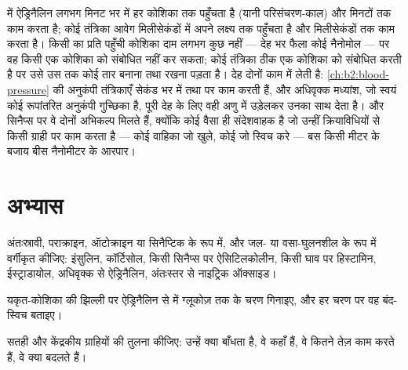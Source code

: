 \begin{example}[दोनों तंत्रों की गति, पहुँच और लागत]\label{ex:b2:cell-signalling:compare}
 में ऐड्रिनैलिन लगभग मिनट भर में हर कोशिका तक पहुँचता है
(यानी परिसंचरण-काल) और मिनटों तक काम करता है; कोई तंत्रिका आवेग
मिलीसेकंडों में अपने लक्ष्य तक पहुँचता है और मिलीसेकंडों तक काम करता है। किसी
 का प्रति पहुँची कोशिका दाम लगभग कुछ नहीं --- देह भर फैला कोई नैनोमोल ---
पर वह किसी एक कोशिका को संबोधित नहीं कर सकता; कोई तंत्रिका ठीक एक
कोशिका को संबोधित करती है पर उसे उस तक कोई तार बनाना तथा रखना पड़ता है। देह
दोनों काम में लेती है: \cref{ch:b2:blood-pressure} की अनुकंपी तंत्रिकाएँ सेकंड भर में
 तथा  पर काम करती हैं, और अधिवृक्क मध्यांश,
जो स्वयं कोई रूपांतरित अनुकंपी गुच्छिका है, पूरी देह के लिए वही अणु
 में उड़ेलकर उनका साथ देता है। और सिनैप्स पर
वे दोनों अभिकल्प मिलते हैं, क्योंकि कोई  वैसा ही संदेशवाहक है जो
उन्हीं क्रियाविधियों से किसी ग्राही पर काम करता है --- कोई वाहिका जो खुले, कोई  जो स्विच करे --- बस किसी मीटर के बजाय बीस नैनोमीटर के
आरपार।
\end{example}

\section{अभ्यास}

\begin{exercise}[$\star$]\label{exo:b2:cell-signalling:1}
अंतःस्रावी, पराक्राइन, ऑटोक्राइन या सिनैप्टिक के रूप में, और
जल- या वसा-घुलनशील के रूप में वर्गीकृत कीजिए: इंसुलिन, कॉर्टिसोल, किसी
सिनैप्स पर ऐसिटिलकोलीन, किसी घाव पर हिस्टामिन, ईस्ट्राडायोल, अधिवृक्क से
ऐड्रिनैलिन, अंतःस्तर से नाइट्रिक ऑक्साइड।
\end{exercise}

\begin{exercise}[$\star$]\label{exo:b2:cell-signalling:2}
यकृत-कोशिका की झिल्ली पर ऐड्रिनैलिन से  में ग्लूकोज़ तक के चरण
गिनाइए, और हर चरण पर वह बंद-स्विच बताइए।
\end{exercise}

\begin{exercise}[$\star$]\label{exo:b2:cell-signalling:3}
सतही और केंद्रकीय ग्राहियों की तुलना कीजिए: उन्हें क्या बाँधता है, वे कहाँ
हैं, वे कितने तेज़ काम करते हैं, वे क्या बदलते हैं।
\end{exercise}

